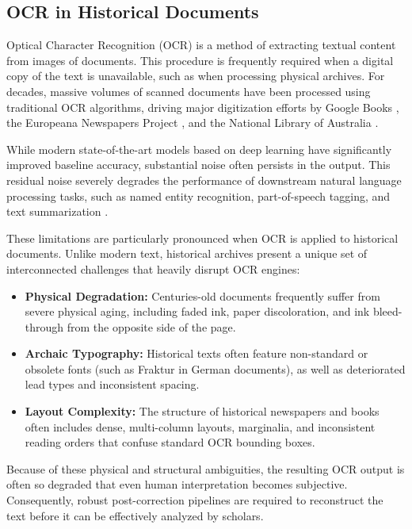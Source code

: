 \documentclass[11pt]{extarticle}
\begin{document}
\subsection{OCR in Historical Documents}
Optical Character Recognition (OCR) is a method of extracting textual content from images of documents. This procedure is frequently required when a digital copy of the text is unavailable, such as when processing physical archives. For decades, massive volumes of scanned documents have been processed using traditional OCR algorithms, driving major digitization efforts by Google Books \cite{leetaru_2008}, the Europeana Newspapers Project \cite{neudecker_2016}, and the National Library of Australia \cite{holley_2009}. 

While modern state-of-the-art models based on deep learning have significantly improved baseline accuracy, substantial noise often persists in the output. This residual noise severely degrades the performance of downstream natural language processing tasks, such as named entity recognition, part-of-speech tagging, and text summarization \cite{10.1007/978-3-030-64452-9_3,vanStrien2020AssessingTI}. 

These limitations are particularly pronounced when OCR is applied to historical documents. Unlike modern text, historical archives present a unique set of interconnected challenges that heavily disrupt OCR engines:
\begin{itemize}
    \item \textbf{Physical Degradation:} Centuries-old documents frequently suffer from severe physical aging, including faded ink, paper discoloration, and ink bleed-through from the opposite side of the page.
    \item \textbf{Archaic Typography:} Historical texts often feature non-standard or obsolete fonts (such as Fraktur in German documents), as well as deteriorated lead types and inconsistent spacing.
    \item \textbf{Layout Complexity:} The structure of historical newspapers and books often includes dense, multi-column layouts, marginalia, and inconsistent reading orders that confuse standard OCR bounding boxes.
\end{itemize}

Because of these physical and structural ambiguities, the resulting OCR output is often so degraded that even human interpretation becomes subjective. Consequently, robust post-correction pipelines are required to reconstruct the text before it can be effectively analyzed by scholars.
\end{document}
